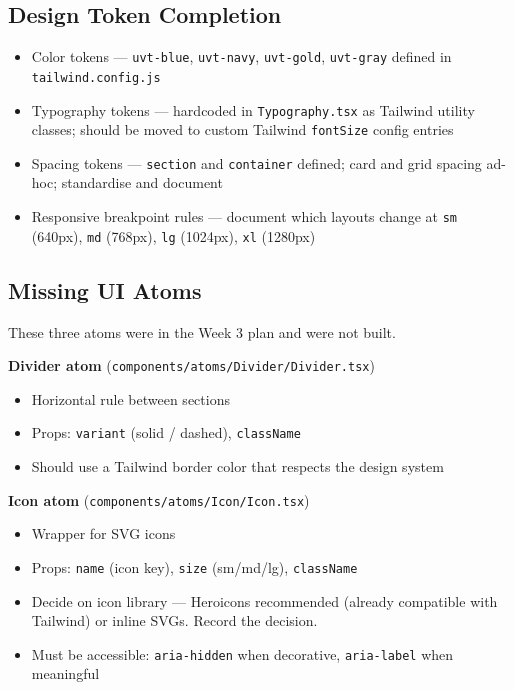 \documentclass[12pt,a4paper]{article}
\begin{document}
\subsection{Design Token Completion}

\begin{itemize}
    \item[\faCheckCircle] Color tokens --- \texttt{uvt-blue}, \texttt{uvt-navy}, \texttt{uvt-gold}, \texttt{uvt-gray} defined in \texttt{tailwind.config.js}
    \item[\faAdjust] Typography tokens --- hardcoded in \texttt{Typography.tsx} as Tailwind utility classes; should be moved to custom Tailwind \texttt{fontSize} config entries
    \item[\faAdjust] Spacing tokens --- \texttt{section} and \texttt{container} defined; card and grid spacing ad-hoc; standardise and document
    \item[$\square$] Responsive breakpoint rules --- document which layouts change at \texttt{sm} (640px), \texttt{md} (768px), \texttt{lg} (1024px), \texttt{xl} (1280px)
\end{itemize}

\subsection{Missing UI Atoms}

These three atoms were in the Week 3 plan and were not built.

\vspace{0.8em}
\noindent\textbf{Divider atom} (\texttt{components/atoms/Divider/Divider.tsx})

\begin{itemize}
    \item[$\square$] Horizontal rule between sections
    \item[$\square$] Props: \texttt{variant} (solid / dashed), \texttt{className}
    \item[$\square$] Should use a Tailwind border color that respects the design system
\end{itemize}

\vspace{0.8em}
\noindent\textbf{Icon atom} (\texttt{components/atoms/Icon/Icon.tsx})

\begin{itemize}
    \item[$\square$] Wrapper for SVG icons
    \item[$\square$] Props: \texttt{name} (icon key), \texttt{size} (sm/md/lg), \texttt{className}
    \item[$\square$] Decide on icon library --- Heroicons recommended (already compatible with Tailwind) or inline SVGs. Record the decision.
    \item[$\square$] Must be accessible: \texttt{aria-hidden} when decorative, \texttt{aria-label} when meaningful
\end{itemize}
\end{document}
